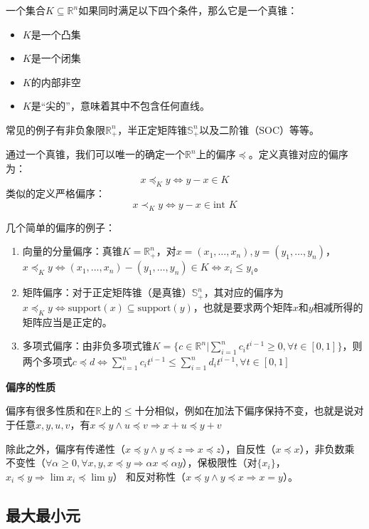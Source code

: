 \documentclass[12pt,a4paper]{book}
\begin{document}
一个集合$K\subseteq\mathbb{R}^n$如果同时满足以下四个条件，那么它是一个真锥：
\begin{itemize}
    \item $K$是一个凸集
    \item $K$是一个闭集
    \item $K$的内部非空
    \item $K$是“尖的”，意味着其中不包含任何直线。
\end{itemize}
常见的例子有非负象限$\mathbb{R}^n_+$，半正定矩阵锥$\mathbb{S}^n_+$以及二阶锥（SOC）等等。

通过一个真锥，我们可以唯一的确定一个$\mathbb{R}^n$上的偏序$\preceq$。定义真锥对应的偏序为：
$$x\preceq_K y \Leftrightarrow y-x \in K$$
类似的定义严格偏序：
$$x\prec_K y \Leftrightarrow y-x \in \text{int }K$$

几个简单的偏序的例子：
\begin{enumerate}
    \item 向量的分量偏序：真锥$K=\mathbb{R}^n_+$，对$x = (x_1,\ldots,x_n),y=(y_1,\ldots,y_n)$，$x\preceq_K y \Leftrightarrow (x_1,\ldots,x_n) - (y_1,\ldots,y_n) \in K \Leftrightarrow x_i\leq y_i$。
    \item 矩阵偏序：对于正定矩阵锥（是真锥）$\mathbb{S}^n_+$，其对应的偏序为$x\preceq_K y \Leftrightarrow \text{support}(x)\subseteq \text{support}(y)$，也就是要求两个矩阵$x$和$y$相减所得的矩阵应当是正定的。
    \item 多项式偏序：由非负多项式锥$K=\{c\in\mathbb{R}^n|\sum_{i=1}^n c_it^{i-1}\geq 0,\forall t \in [0,1]\}$，则两个多项式$c\preceq d \Leftrightarrow \sum_{i=1}^n c_it^{i-1} \leq \sum_{i=1}^n d_it^{i-1},\forall t\in [0,1]$
\end{enumerate}

\textbf{偏序的性质}

偏序有很多性质和在$\mathbb{R}$上的$\leq$十分相似，例如在加法下偏序保持不变，也就是说对于任意$x,y,u,v$，有$x\preceq y \wedge u\preceq v \Rightarrow  x+u\preceq y+v$

除此之外，偏序有传递性（$x\preceq y \wedge y\preceq z\Rightarrow x\preceq z$），自反性（$x\preceq x$），非负数乘不变性（$\forall \alpha \geq 0, \forall x,y,x\preceq y \Rightarrow \alpha x\preceq \alpha y$），保极限性（对$\{x_i\}$，$x_i\preceq y \Rightarrow \lim x_i\preceq \lim y$）
和反对称性（$x\preceq y \wedge y\preceq x \Rightarrow x=y$）。

\subsection{最大最小元}
\end{document}
